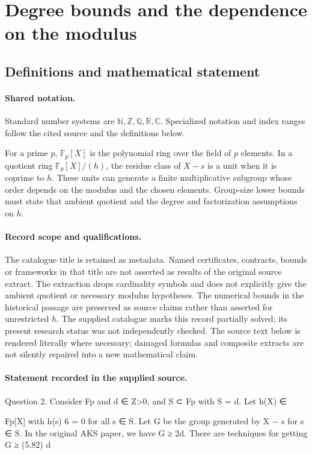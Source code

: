 \documentclass[11pt]{article}
\begin{document}
\section{Degree bounds and the dependence on the modulus}\label{statement}

\subsection{Definitions and mathematical statement}

\paragraph{Shared notation.}Standard number systems are $\mathbb N,\mathbb Z,\mathbb Q,\mathbb R,\mathbb C$. Specialized notation and index ranges follow the cited source and the definitions below.


For a prime $p$, $\mathbb F_p[X]$ is the polynomial ring over the field of $p$ elements. In a quotient ring $\mathbb F_p[X]/(h)$, the residue class of $X-s$ is a unit when it is coprime to $h$. These units can generate a finite multiplicative subgroup whose order depends on the modulus and the chosen elements. Group-size lower bounds must state that ambient quotient and the degree and factorization assumptions on $h$.
\paragraph{Record scope and qualifications.}
The catalogue title is retained as metadata. Named certificates, contracts, bounds or frameworks in that title are not asserted as results of the original source extract.
The extraction drops cardinality symbols and does not explicitly give the ambient quotient or necessary modulus hypotheses. The numerical bounds in the historical passage are preserved as source claims rather than asserted for unrestricted $h$. The supplied catalogue marks this record partially solved; its present research status was not independently checked.
The source text below is rendered literally where necessary; damaged formulas and composite extracts are not silently repaired into a new mathematical claim.
\paragraph{Statement recorded in the supplied source.}
Question 2. Consider Fp and d ∈ Z>0, and S ⊂ Fp with S = d. Let h(X) ∈

Fp[X] with h(s) 6 = 0 for all s ∈ S. Let G be the group generated by X − s for s ∈ S. In the original AKS paper, we have G ≥ 2d. There are techniques for getting G ≥ (5.82) d
\end{document}
